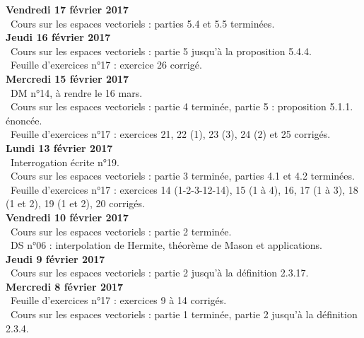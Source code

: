 \documentclass[12pt,a4paper]{article}
\begin{document}
\noindent\textbf{Vendredi 17 février 2017}\\
\bu\ Cours sur les espaces vectoriels :  parties 5.4 et 5.5 terminées.\vspace{.4cm}\\

\noindent\textbf{Jeudi 16 février 2017}\\
\bu\ Cours sur les espaces vectoriels :  partie 5 jusqu'à la proposition 5.4.4.\\
\bu\ Feuille d'exercices n°17 : exercice 26 corrigé.\vspace{.4cm}\\

\noindent\textbf{Mercredi 15 février 2017}\\
\bu\ DM n°14, à rendre le 16 mars.\\
\bu\ Cours sur les espaces vectoriels : partie 4 terminée, partie 5 : proposition 5.1.1. énoncée.\\
\bu\ Feuille d'exercices n°17 : exercices 21, 22 (1), 23 (3), 24 (2) et 25 corrigés.\vspace{.4cm}\\

\noindent\textbf{Lundi 13 février 2017}\\
\bu\ Interrogation écrite n°19.\\
\bu\ Cours sur les espaces vectoriels : partie 3 terminée, parties 4.1 et 4.2 terminées.\\
\bu\ Feuille d'exercices n°17 : exercices 14 (1-2-3-12-14), 15 (1 à 4), 16, 17 (1 à 3), 18 (1 et 2), 19 (1 et 2), 20 corrigés.\vspace{.4cm}\\

\noindent\textbf{Vendredi 10 février 2017}\\
\bu\ Cours sur les espaces vectoriels : partie 2 terminée.\\
\bu\ DS n°06 : interpolation de Hermite, théorème de Mason et applications.\vspace{.4cm}\\

\noindent\textbf{Jeudi 9 février 2017}\\
\bu\ Cours sur les espaces vectoriels : partie 2 jusqu'à la définition 2.3.17.\vspace{.4cm}\\

\noindent\textbf{Mercredi 8 février 2017}\\
\bu\ Feuille d'exercices n°17 : exercices 9 à 14 corrigés.\\
\bu\ Cours sur les espaces vectoriels : partie 1 terminée, partie 2 jusqu'à la définition 2.3.4.\vspace{.4cm}\\
\end{document}
